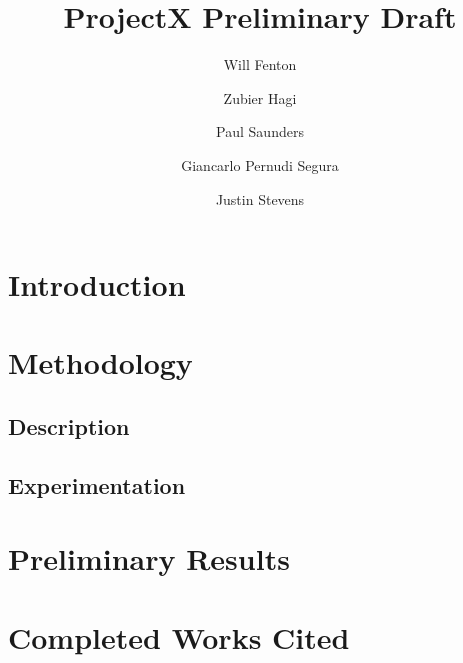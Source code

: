 \documentclass[11pt]{article}
\title{ProjectX Preliminary Draft}
\author{Will Fenton}
\author{Zubier Hagi}
\author{Paul Saunders}
\author{Giancarlo Pernudi Segura}
\author{Justin Stevens}
\affil{University of Alberta}
\begin{document}
\maketitle

\section{Introduction}

\section{Methodology}
\subsection{Description}

\subsection{Experimentation}

\section{Preliminary Results}

\section{Completed Works Cited}

\printbibliography
\end{document}
